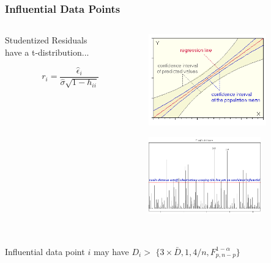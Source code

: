 \documentclass[xcolor={dvipsnames}]{beamer}
\begin{document}
\frame
{
 \frametitle{Influential Data Points}


\begin{columns}
\begin{column}{.45\textwidth}

\textcolor{NavyBlue}{Studentized Residuals\\ have a t-distribution...}

$$ r_i = \frac{\hat \epsilon_i}{\hat \sigma \sqrt{1-h_{ii}} }$$ \\${}$\\${}$\\${}$



\end{column}
\begin{column}{.55\textwidth}
\includegraphics[width=2in]{stuff/hl_regress_confiv.png}

\hspace{.5em}\includegraphics[width=1.9in]{stuff/cooks2.png}

\end{column}
\end{columns}

${}$\\

Influential data point $i$ may have $D_i >$ 
$\{ 3 \times \bar D, 1, 4/n, F_{p,n-p}^{1-\alpha}\}$


}
\end{document}
